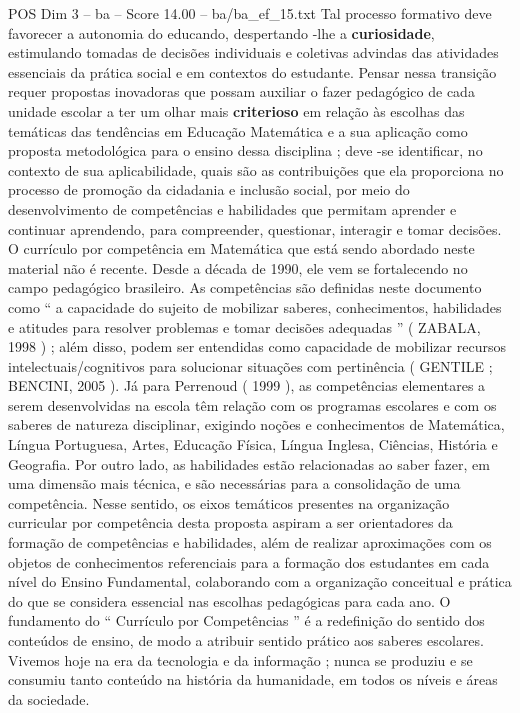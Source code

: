 \begin{textsample}{POS Dim 3 – ba – Score 14.00 – ba/ba\_ef\_15.txt}
Tal processo formativo deve favorecer a autonomia do educando, despertando -lhe a \textbf{curiosidade}, estimulando tomadas de decisões individuais e coletivas advindas das atividades essenciais da prática social e em contextos do estudante.
Pensar nessa transição requer propostas inovadoras que possam auxiliar o fazer pedagógico de cada unidade escolar a ter um olhar mais \textbf{criterioso} em relação às escolhas das temáticas das tendências em Educação Matemática e a sua aplicação como proposta metodológica para o ensino dessa disciplina ; deve -se identificar, no contexto de sua aplicabilidade, quais são as contribuições que ela proporciona no processo de promoção da cidadania e inclusão social, por meio do desenvolvimento de competências e habilidades que permitam aprender e continuar aprendendo, para compreender, questionar, interagir e tomar decisões.
O currículo por competência em Matemática que está sendo abordado neste material não é recente.
Desde a década de 1990, ele vem se fortalecendo no campo pedagógico brasileiro.
As competências são definidas neste documento como “ a capacidade do sujeito de mobilizar saberes, conhecimentos, habilidades e atitudes para resolver problemas e tomar decisões adequadas ” ( ZABALA, 1998 ) ; além disso, podem ser entendidas como capacidade de mobilizar recursos intelectuais/cognitivos para solucionar situações com pertinência ( GENTILE ; BENCINI, 2005 ).
Já para Perrenoud ( 1999 ), as competências elementares a serem desenvolvidas na escola têm relação com os programas escolares e com os saberes de natureza disciplinar, exigindo noções e conhecimentos de Matemática, Língua Portuguesa, Artes, Educação Física, Língua Inglesa, Ciências, História e Geografia.
Por outro lado, as habilidades estão relacionadas ao saber fazer, em uma dimensão mais técnica, e são necessárias para a consolidação de uma competência.
Nesse sentido, os eixos temáticos presentes na organização curricular por competência desta proposta aspiram a ser orientadores da formação de competências e habilidades, além de realizar aproximações com os objetos de conhecimentos referenciais para a formação dos estudantes em cada nível do Ensino Fundamental, colaborando com a organização conceitual e prática do que se considera essencial nas escolhas pedagógicas para cada ano.
O fundamento do “ Currículo por Competências ” é a redefinição do sentido dos conteúdos de ensino, de modo a atribuir sentido prático aos saberes escolares.
Vivemos hoje na era da tecnologia e da informação ; nunca se produziu e se consumiu tanto conteúdo na história da humanidade, em todos os níveis e áreas da sociedade.

\end{textsample}
